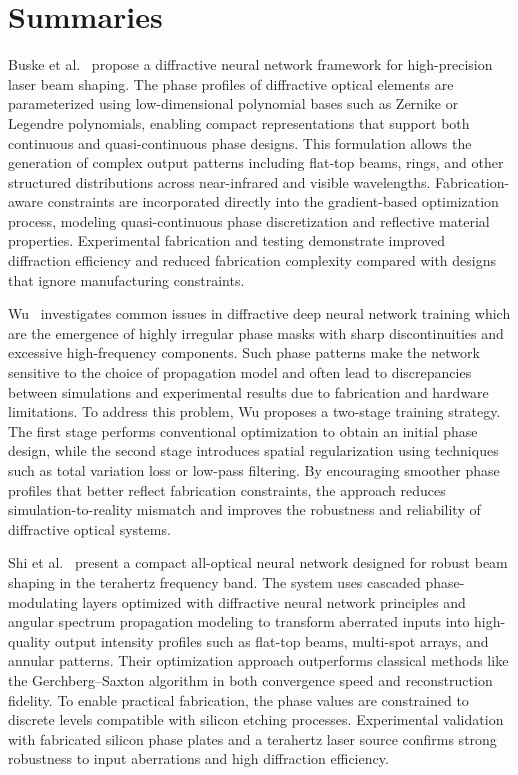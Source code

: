 \documentclass[12pt]{article}
\begin{document}
\section{Summaries}
Buske et al.~\cite{buske2025diffractive} propose a diffractive neural network framework for high-precision laser beam shaping. The phase profiles of diffractive optical elements are parameterized using low-dimensional polynomial bases such as Zernike or Legendre polynomials, enabling compact representations that support both continuous and quasi-continuous phase designs. This formulation allows the generation of complex output patterns including flat-top beams, rings, and other structured distributions across near-infrared and visible wavelengths. Fabrication-aware constraints are incorporated directly into the gradient-based optimization process, modeling quasi-continuous phase discretization and reflective material properties. Experimental fabrication and testing demonstrate improved diffraction efficiency and reduced fabrication complexity compared with designs that ignore manufacturing constraints.

Wu~\cite{wu2024phase} investigates common issues in diffractive deep neural network training which are the emergence of highly irregular phase masks with sharp discontinuities and excessive high-frequency components. Such phase patterns make the network sensitive to the choice of propagation model and often lead to discrepancies between simulations and experimental results due to fabrication and hardware limitations. To address this problem, Wu proposes a two-stage training strategy. The first stage performs conventional optimization to obtain an initial phase design, while the second stage introduces spatial regularization using techniques such as total variation loss or low-pass filtering. By encouraging smoother phase profiles that better reflect fabrication constraints, the approach reduces simulation-to-reality mismatch and improves the robustness and reliability of diffractive optical systems.

Shi et al.~\cite{shi2021robust} present a compact all-optical neural network designed for robust beam shaping in the terahertz frequency band. The system uses cascaded phase-modulating layers optimized with diffractive neural network principles and angular spectrum propagation modeling to transform aberrated inputs into high-quality output intensity profiles such as flat-top beams, multi-spot arrays, and annular patterns. Their optimization approach outperforms classical methods like the Gerchberg–Saxton algorithm in both convergence speed and reconstruction fidelity. To enable practical fabrication, the phase values are constrained to discrete levels compatible with silicon etching processes. Experimental validation with fabricated silicon phase plates and a terahertz laser source confirms strong robustness to input aberrations and high diffraction efficiency.
\end{document}

